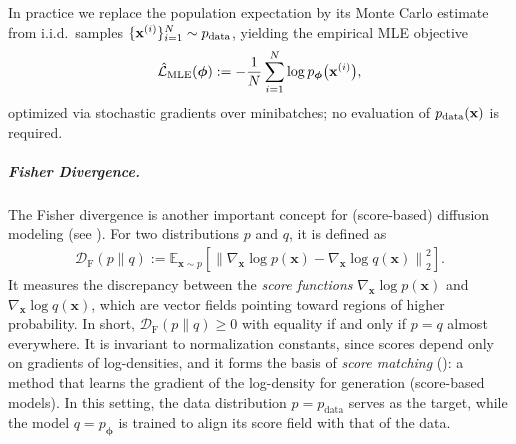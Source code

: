 In practice we replace the population expectation by its Monte Carlo estimate from i.i.d.\ samples $\{{\mathbf{x}}^{(i)}\}_{i=1}^N \sim p_{\mathrm{data}}$, yielding the empirical MLE objective
\begin{align*}
  \hat{\mathcal{L}}_{\mathrm{MLE}}(\bm{\phi})
  := -\frac{1}{N}\sum_{i=1}^N \log p_{\bm{\phi}} \big({\mathbf{x}}^{(i)}\big),
\end{align*}
optimized via stochastic gradients over minibatches; no evaluation of $p_{\mathrm{data}}({\mathbf{x}})$ is required.

\subparagraph{Fisher Divergence.} The Fisher divergence is another important concept for (score-based) diffusion modeling (see ). For two distributions $p$ and $q$, it is defined as
\begin{align}\label{eq:fisher}
    \mathcal D_{\mathrm F}(p \|  q)
:=
\mathbb{E}_{\mathbf{x}\sim p} \left[
\left\|\nabla_{\mathbf x}\log p(\mathbf x)-\nabla_{\mathbf x}\log q(\mathbf x)\right\|_2^{2}
\right].
\end{align}
It measures the discrepancy between the \emph{score functions} 
$\nabla_{\mathbf x}\log p(\mathbf x)$ and $\nabla_{\mathbf x}\log q(\mathbf x)$,
which are vector fields pointing toward regions of higher probability. 
In short, $\mathcal D_{\mathrm F}(p \|  q)\ge 0$ with equality if and only if $p=q$ almost everywhere. 
It is invariant to normalization constants, since scores depend only on gradients of log-densities, 
and it forms the basis of \emph{score matching} (): a method that learns the gradient of the log-density for generation (score-based models). 
In this setting, the data distribution $p=p_{\mathrm{data}}$ serves as the target, 
while the model $q=p_{\bm{\phi}}$ is trained to align its score field with that of the data.





